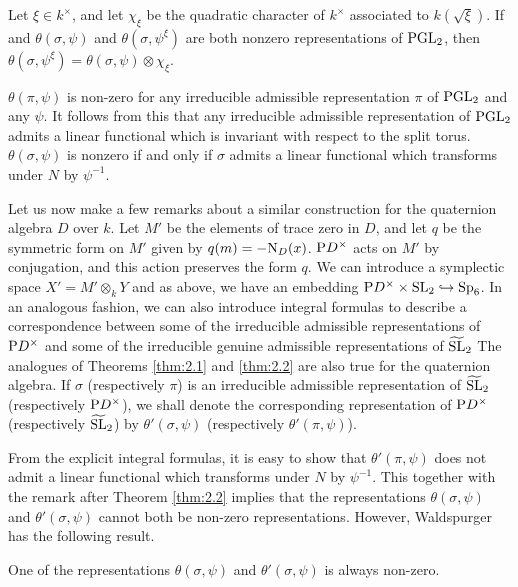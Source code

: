 \begin{theorem}
\label{thm:2.2}
Let $\xi \in k^\times$, and let $\chi_\xi$ be the quadratic character of $k^\times$ associated to $k(\sqrt{\xi})$.
If and $\theta(\sigma, \psi)$ and $\theta(\sigma, \psi^\xi)$ are both nonzero representations of $\mathrm{PGL}_2$, then $\theta(\sigma, \psi^\xi) = \theta(\sigma, \psi) \otimes \chi_\xi$.
\end{theorem}
\begin{remark*}
$\theta(\pi, \psi)$ is non-zero for any irreducible admissible representation $\pi$ of $\mathrm{PGL}_2$ and any $\psi$.
It follows from this that any irreducible admissible representation of $\mathrm{PGL}_2$ admits a linear functional which is invariant with respect to the split torus.
$\theta(\sigma, \psi)$ is nonzero if and only if $\sigma$ admits a linear functional which transforms under $N$ by $\psi^{-1}$.
\end{remark*}

Let us now make a few remarks about a similar construction for the quaternion algebra $D$ over $k$.
Let $M'$ be the elements of trace zero in $D$, and let $q$ be the symmetric form on $M'$ given by $q(m) = -\mathrm{N}_D(x)$.
$\mathrm{P} D^\times$ acts on $M'$ by conjugation, and this action preserves the form $q$.
We can introduce a symplectic space $X' = M'\otimes_k Y$ and as above, we have an embedding $\mathrm{P} D^\times \times \mathrm{SL}_2 \hookrightarrow \mathrm{Sp}_6$.
In an analogous fashion,
we can also introduce integral formulas to describe a correspondence between some of the irreducible admissible representations of $\mathrm{P} D^\times$ and some of the irreducible genuine admissible representations of $\widetilde{\mathrm{SL}}_2$
The analogues of Theorems \ref{thm:2.1} and \ref{thm:2.2} are also true for the quaternion algebra.
If $\sigma$ (respectively $\pi$) is an irreducible admissible representation of $\widetilde{\mathrm{SL}}_2$ (respectively $\mathrm{P} D^\times$), we shall denote the corresponding representation of $\mathrm{P} D^\times$ (respectively $\widetilde{\mathrm{SL}}_2$) by $\theta'(\sigma, \psi)$ (respectively $\theta'(\pi,\psi)$).

From the explicit integral formulas, it is easy to show that
$\theta'(\pi, \psi)$ does not admit a linear functional which transforms under $N$ by $\psi^{-1}$.
This together with the remark after Theorem \ref{thm:2.2} implies that the representations $\theta(\sigma, \psi)$ and $\theta'(\sigma, \psi)$ cannot both be non-zero representations.
However, Waldspurger has the following result.
\begin{theorem}
\label{thm:2.3}
One of the representations $\theta(\sigma, \psi)$ and $\theta'(\sigma, \psi)$ is always non-zero.
\end{theorem}

